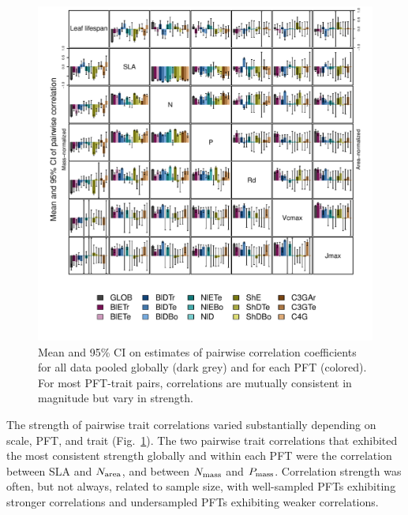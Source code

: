 \begin{figure}
  \centering
  \includegraphics[width=\textwidth]{1_mvtraits/figures/correlation_boxplot.pdf}
  \caption{%
    Mean and 95\% CI on estimates of pairwise correlation coefficients
    for all data pooled globally (dark grey) and for each PFT (colored).
    For most PFT-trait pairs, correlations are mutually consistent in magnitude but vary in strength.
  }\label{fig:mvtraits-fig5}
\end{figure}

The strength of pairwise trait correlations varied substantially depending on scale, PFT, and trait (Fig.~\ref{fig:mvtraits-fig5}).
The two pairwise trait correlations that exhibited the most consistent strength globally and within each PFT were the correlation between SLA and $N_{\text{area}}$, and between $N_{\text{mass}}$ and $P_{\text{mass}}$.
Correlation strength was often, but not always, related to sample size, with well-sampled PFTs exhibiting stronger correlations and undersampled PFTs exhibiting weaker correlations.
